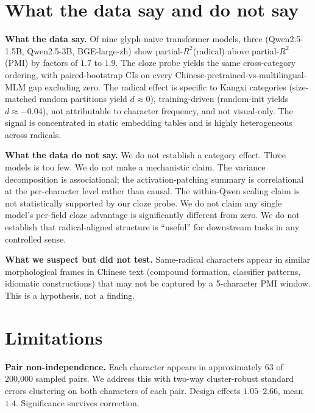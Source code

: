 \documentclass[11pt,a4paper,twocolumn]{article}
\begin{document}
\section{What the data say and do not say}

\noindent\textbf{What the data say.}
Of nine glyph-naive transformer models, three (Qwen2.5-1.5B,
Qwen2.5-3B, BGE-large-zh) show partial-$R^2$(radical) above
partial-$R^2$(PMI) by factors of $1.7$ to $1.9$. The cloze probe
yields the same cross-category ordering, with paired-bootstrap CIs on
every Chinese-pretrained-vs-multilingual-MLM gap excluding zero. The
radical effect is specific to Kangxi categories (size-matched random
partitions yield $d \approx 0$), training-driven (random-init yields
$d \approx -0.04$), not attributable to character frequency, and not
visual-only. The signal is concentrated in static embedding tables and
is highly heterogeneous across radicals.

\noindent\textbf{What the data do not say.}
We do not establish a category effect. Three models is too few. We do
not make a mechanistic claim. The variance decomposition is
associational; the activation-patching summary is correlational at the
per-character level rather than causal. The within-Qwen scaling claim
is not statistically supported by our cloze probe. We do not claim any
single model's per-field cloze advantage is significantly different
from zero. We do not establish that radical-aligned structure is
``useful'' for downstream tasks in any controlled sense.

\noindent\textbf{What we suspect but did not test.}
Same-radical characters appear in similar morphological frames in
Chinese text (compound formation, classifier patterns, idiomatic
constructions) that may not be captured by a 5-character PMI window.
This is a hypothesis, not a finding.

\section{Limitations}
\label{sec:limits}

\noindent\textbf{Pair non-independence.}
Each character appears in approximately 63 of 200{,}000 sampled pairs.
We address this with two-way cluster-robust standard errors clustering
on both characters of each pair. Design effects $1.05\text{--}2.66$,
mean $1.4$. Significance survives correction.
\end{document}
